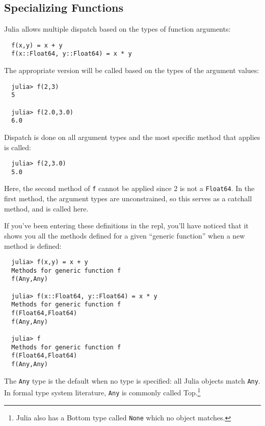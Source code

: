 \documentclass{article}
\renewcommand{\sec}[1]{\label{sec:#1}}
\begin{document}
\subsection{Specializing Functions}\sec{specializing-functions}

Julia allows multiple dispatch based on the types of function arguments:
\begin{verbatim}
  f(x,y) = x + y
  f(x::Float64, y::Float64) = x * y
\end{verbatim}
The appropriate version will be called based on the types of the argument values:
\begin{verbatim}
  julia> f(2,3)
  5

  julia> f(2.0,3.0)
  6.0
\end{verbatim}
Dispatch is done on all argument types and the most specific method that applies is called:
\begin{verbatim}
  julia> f(2,3.0)
  5.0
\end{verbatim}
Here, the second method of \verb|f| cannot be applied since 2 is not a \verb|Float64|.
In the first method, the argument types are unconstrained, so this serves as a catchall method, and is called here.

If you've been entering these definitions in the repl, you'll have noticed that it shows you all the methods defined for a given ``generic function'' when a new method is defined:
\begin{verbatim}
  julia> f(x,y) = x + y
  Methods for generic function f
  f(Any,Any)

  julia> f(x::Float64, y::Float64) = x * y
  Methods for generic function f
  f(Float64,Float64)
  f(Any,Any)

  julia> f
  Methods for generic function f
  f(Float64,Float64)
  f(Any,Any)
\end{verbatim}
The \verb|Any| type is the default when no type is specified:
all Julia objects match \verb|Any|.
In formal type system literature, \verb|Any| is commonly called Top.\footnote{Julia also has a Bottom type called \texttt{None} which no object matches.}
\end{document}
